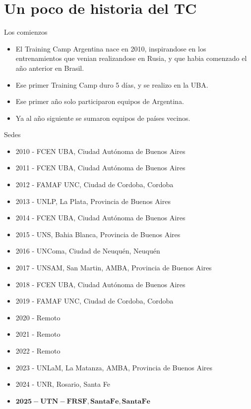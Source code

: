 \documentclass{beamer}
\begin{document}
\section{Un poco de historia del TC}

\begin{frame}{Los comienzos}
    
    \begin{itemize}
        \item El Training Camp Argentina nace en 2010, inspirandose en los entrenamientos que venian realizandose en Rusia, y que habia comenzado el año anterior en Brasil.
        \item Ese primer Training Camp duro 5 días, y se realizo en la UBA.
        \item Ese primer año solo participaron equipos de Argentina.
        \item Ya al año siguiente se sumaron equipos de países vecinos.
    \end{itemize}
\end{frame}

\begin{frame}{Sedes}
    \begin{itemize}
        \item 2010 - FCEN UBA, Ciudad Autónoma de Buenos Aires
        \item 2011 - FCEN UBA, Ciudad Autónoma de Buenos Aires
        \item 2012 - FAMAF UNC, Ciudad de Cordoba, Cordoba
        \item 2013 - UNLP, La Plata, Provincia de Buenos Aires
        \item 2014 - FCEN UBA, Ciudad Autónoma de Buenos Aires
        \item 2015 - UNS, Bahia Blanca, Provincia de Buenos Aires
        \item 2016 - UNComa, Ciudad de Neuquén, Neuquén
        \item 2017 - UNSAM, San Martin, AMBA, Provincia de Buenos Aires
        \item 2018 - FCEN UBA, Ciudad Autónoma de Buenos Aires
        \item 2019 - FAMAF UNC, Ciudad de Cordoba, Cordoba
        \item 2020 - Remoto
        \item 2021 - Remoto
        \item 2022 - Remoto
        \item 2023 - UNLaM, La Matanza, AMBA, Provincia de Buenos Aires
        \item 2024 - UNR, Rosario, Santa Fe
        \item $\bm{2025 - UTN-FRSF, Santa Fe, Santa Fe}$
    \end{itemize}
\end{frame}
\end{document}

